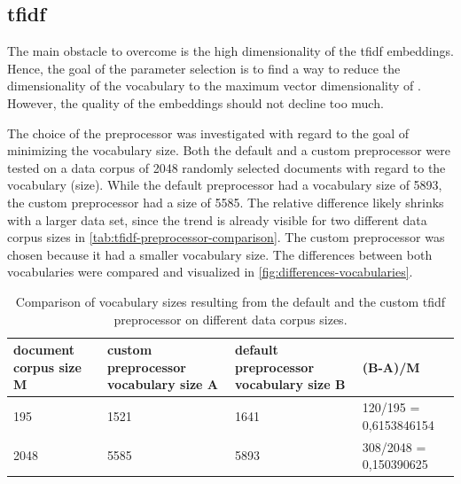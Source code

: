 \subsection*{\acs{tfidf}}\label{subsec:evaluation-tfidf}

The main obstacle to overcome is the high dimensionality of the \ac{tfidf} embeddings.
Hence, the goal of the parameter selection is to find a way to reduce the dimensionality of the vocabulary to the maximum vector dimensionality of \databaseName{}.
However, the quality of the embeddings should not decline too much.

The choice of the preprocessor was investigated with regard to the goal of minimizing the vocabulary size.
Both the default and a custom preprocessor were tested on a data corpus of 2048 randomly selected documents with regard to the vocabulary (size).
While the default preprocessor had a vocabulary size of 5893, the custom preprocessor had a size of 5585.
The relative difference likely shrinks with a larger data set, 
since the trend is already visible for two different data corpus sizes in \autoref{tab:tfidf-preprocessor-comparison}.
The custom preprocessor was chosen because it had a smaller vocabulary size.
The differences between both vocabularies were compared and visualized in \autoref{fig:differences-vocabularies}.

\begin{table}[]
    \caption[Comparison of the default and the custom \ac{tfidf} preprocessor]
    {Comparison of vocabulary sizes resulting from the default and the custom \ac{tfidf} preprocessor on different data corpus sizes.}
    \begin{tabular}{|p{}|p{}|p{}|p{}|}
    \hline
    \rowcolor[HTML]{C0C0C0} 
    {\color[HTML]{000000} \textbf{document corpus size M}} & {\color[HTML]{000000} \textbf{custom preprocessor vocabulary size A}} & {\color[HTML]{000000} \textbf{default preprocessor vocabulary size B}} & {\color[HTML]{000000} \textbf{(B-A)/M}} \\ \hline
    195                                                    & 1521                                                                  & 1641                                                                   & 120/195 = 0,6153846154                  \\ \hline
    2048                                                   & 5585                                                                  & 5893                                                                   & 308/2048 = 0,150390625                  \\ \hline
    \end{tabular}
    \label{tab:tfidf-preprocessor-comparison}
\end{table}

